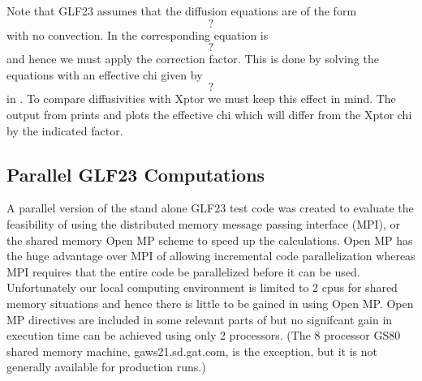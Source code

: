 Note that GLF23 assumes that the diffusion equations are of the
form
\[ ? \]
with no convection. In \ot the corresponding equation is
\[ ? \]
and hence we must apply the correction factor. This is done
by solving the equations with an effective chi given by
\[ ? \]
in \ot. To compare diffusivities with Xptor we must keep
this effect in mind. The output from \ot prints and plots the
effective chi which will differ from the Xptor chi by the
indicated factor.

\subsection{Parallel GLF23  Computations}

A parallel version of the stand alone GLF23 test code was created to evaluate 
the feasibility of using the distributed memory   message passing interface
(MPI), or the shared memory Open MP scheme to speed up the calculations. Open MP
has the huge  advantage over MPI of allowing incremental code parallelization 
whereas MPI  requires that the entire code be parallelized before it can be
used. Unfortunately our local computing environment is limited to 2 cpus for
shared memory situations and hence  there is little to be gained in using Open
MP.  Open MP directives are   included in some relevant parts of \ot but no
signifcant gain in execution time can be achieved using only 2 processors. (The
8 processor GS80 shared memory machine, gaws21.sd.gat.com, is the exception, but
it is not generally available for production \ot runs.)

